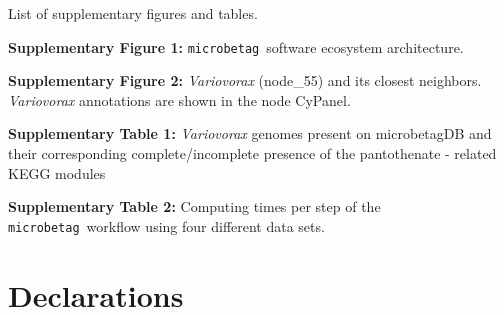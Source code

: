 \documentclass[sn-mathphys,Numbered]{sn-jnl}  %
\theoremstyle{thmstyleone}%
\theoremstyle{thmstyletwo}%
\theoremstyle{thmstylethree}%
\newcommand{\microbetag}{\texttt{microbetag}}
\begin{document}
\backmatter



\label{supplementary-files}
    
    List of supplementary figures and tables.

    \textbf{Supplementary Figure 1:} \microbetag~\space software ecosystem architecture.

    \textbf{Supplementary Figure 2:} \textit{Variovorax} (node\_55) and its closest neighbors. \textit{Variovorax} annotations are shown in the node CyPanel.

    \textbf{Supplementary Table 1:} \textit{Variovorax} genomes present on microbetagDB and their corresponding complete/incomplete presence of the pantothenate - 
    related KEGG modules

    \textbf{Supplementary Table 2:} Computing times per step of the \microbetag~\space workflow using four different data sets. 



\section*{Declarations}
\end{document}
